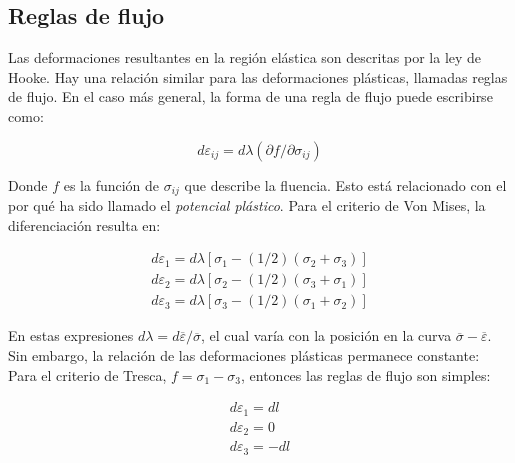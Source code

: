 \subsection{Reglas de flujo}

Las deformaciones resultantes en la región elástica son descritas por la ley de Hooke. 
Hay una relación similar para las deformaciones plásticas, llamadas reglas de flujo. 
En el caso más general, la forma de una regla de flujo puede escribirse como: ~\cite{hosford2007}

\begin{equation}
d\varepsilon_{ij} = d\lambda (\partial f / \partial \sigma_{ij})
\end{equation}

Donde $f$ es la función de $\sigma_{ij}$ que describe la fluencia. Esto está relacionado 
con el por qué ha sido llamado el \textit{potencial plástico}. Para el criterio de 
Von Mises, la diferenciación resulta en: ~\cite{hosford2007}

\begin{align}
d\varepsilon_1 = d\lambda \left[ \sigma_1 - (1/2) (\sigma_2 + \sigma_3) \right] \\
d\varepsilon_2 = d\lambda \left[ \sigma_2 - (1/2) (\sigma_3 + \sigma_1) \right] \\
d\varepsilon_3 = d\lambda \left[ \sigma_3 - (1/2) (\sigma_1 + \sigma_2) \right]
\end{align}

En estas expresiones $d\lambda = d \overline{\varepsilon} / \overline{\sigma} $, el cual varía 
con la posición en la curva $ \overline{\sigma} - \overline{\varepsilon} $. Sin embargo, la 
relación de las deformaciones plásticas permanece constante: ~\cite{hosford2007} \\


Para el criterio de Tresca, $f = \sigma_1 - \sigma_3$, entonces las reglas de flujo son simples:
~\cite{hosford2007}

\begin{align*}
d\varepsilon_1 = dl \\
d\varepsilon_2 = 0 \\
d\varepsilon_3 = -dl
\end{align*}


